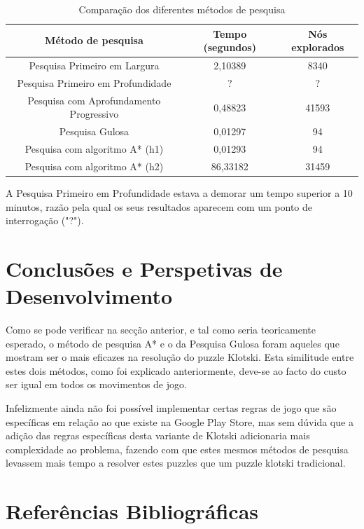 \documentclass[conference]{IEEEtran}
\begin{document}
\begin{table}[htbp]
\caption{Comparação dos diferentes métodos de pesquisa}
\begin{center}
\begin{tabular}{|c|c|c|}
\hline
\textbf{Método de pesquisa} & \textbf{Tempo (segundos)} & \textbf{Nós explorados} \\
\hline
 Pesquisa Primeiro em Largura & 2,10389 & 8340\\
 Pesquisa Primeiro em Profundidade & ? & ?\\
 Pesquisa com Aprofundamento Progressivo & 0,48823 & 41593\\
 Pesquisa Gulosa & 0,01297 & 94\\ 
 Pesquisa com algoritmo A* (h1) & 0,01293 & 94\\
 Pesquisa com algoritmo A* (h2) & 86,33182 & 31459\\
\hline



\end{tabular}
\label{tab1}
\end{center}
\end{table}

A Pesquisa Primeiro em Profundidade estava a demorar um tempo superior a 10 minutos, razão pela qual os seus resultados aparecem com um ponto de interrogação ("?").

\section{Conclusões e Perspetivas de Desenvolvimento}


Como se pode verificar na secção anterior, e tal como seria teoricamente esperado, o método de pesquisa A* e o da Pesquisa Gulosa foram aqueles que mostram ser o mais eficazes na resolução do puzzle Klotski. Esta similitude entre estes dois métodos, como foi explicado anteriormente, deve-se ao facto do custo ser igual em todos os movimentos de jogo.

Infelizmente ainda não foi possível implementar certas regras de jogo que são específicas em relação ao que existe na Google Play Store, mas sem dúvida que a adição das regras específicas desta variante de Klotski adicionaria mais complexidade ao problema, fazendo com que estes mesmos métodos de pesquisa levassem mais tempo a resolver estes puzzles que um puzzle klotski tradicional.






\section*{Referências Bibliográficas}
\end{document}
